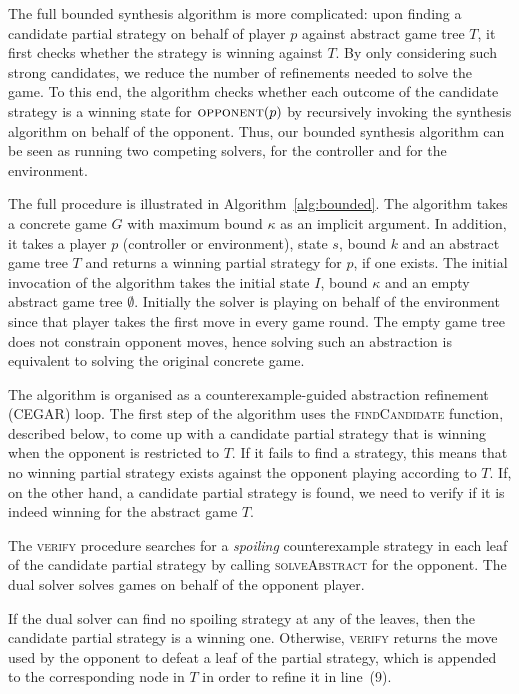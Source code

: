 The full bounded synthesis algorithm is more complicated: upon finding a candidate 
partial strategy on behalf of player $p$ against abstract game tree $T$, it first checks whether the strategy is winning 
against $T$.  By only considering such strong candidates, we reduce the number of 
refinements needed to solve the game.  To this end, the algorithm checks whether each 
outcome of the candidate strategy is a winning state for $\textsc{opponent}(p)$ by recursively 
invoking the synthesis algorithm on behalf of the opponent.  Thus, our bounded
synthesis algorithm can be seen as running two competing solvers, for the
controller and for the environment. 



The full procedure is illustrated in Algorithm~\ref{alg:bounded}.  The
algorithm takes a concrete game $G$ with maximum bound $\kappa$ as an implicit
argument.  In addition, it takes a player $p$ (controller or environment),
state $s$, bound $k$ and an abstract game tree $T$ and returns a winning
partial strategy for $p$, if one exists.  The initial invocation of the
algorithm takes the initial state $I$, bound $\kappa$ and an empty abstract
game tree $\emptyset$.  Initially the solver is playing on behalf of the
environment since that player takes the first move in every game round.  The
empty game tree does not constrain opponent moves, hence solving such an
abstraction is equivalent to solving the original concrete game.

The algorithm is organised as a counterexample-guided abstraction refinement
(CEGAR) loop.  The first step of the algorithm uses the \textsc{findCandidate}
function, described below, to come up with a candidate partial strategy that is
winning when the opponent is restricted to $T$.  If it fails to find a
strategy, this means that no winning partial strategy exists against the opponent
playing according to $T$.  If, on the other hand, a
candidate partial strategy is found, we need to verify if it is indeed winning
for the abstract game $T$.

The \textsc{verify} procedure searches for a \emph{spoiling} counterexample
strategy in each leaf of the candidate partial strategy by calling
\textsc{solveAbstract} for the opponent. The dual solver solves games on behalf
of the opponent player.  

If the dual solver can find no spoiling strategy at any of the leaves, then the
candidate partial strategy is a winning one. Otherwise, \textsc{verify} returns
the move used by the opponent to defeat a leaf of the partial strategy, which
is appended to the corresponding node in $T$ in order to refine it in line~(9).

